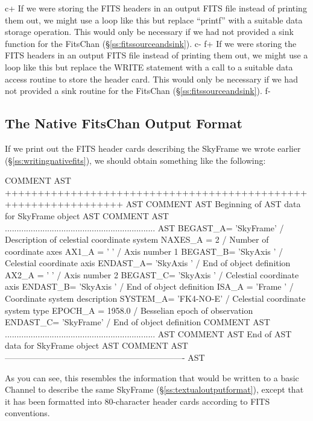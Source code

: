 \documentclass[twoside,11pt]{starlink}
\providecommand{\secref}[1]{\S\ref{#1}}
\begin{document}
{c+
If we were storing the FITS headers in an output FITS file instead of
printing them out, we might use a loop like this but replace
``printf'' with a suitable data storage operation. This would only be
necessary if we had not provided a sink function for the FitsChan
(\secref{ss:fitssourceandsink}).
c-
f+
If we were storing the FITS headers in an output FITS file instead of
printing them out, we might use a loop like this but replace the WRITE
statement with a call to a suitable data access routine to store the
header card. This would only be necessary if we had not provided a
sink routine for the FitsChan (\secref{ss:fitssourceandsink}).
f-

\subsection{The Native FitsChan Output Format}

If we print out the FITS header cards describing the SkyFrame we wrote
earlier (\secref{ss:writingnativefits}), we should obtain something
like the following:

\small
\begin{terminalv}
COMMENT AST ++++++++++++++++++++++++++++++++++++++++++++++++++++++++++++++++ AST
COMMENT AST            Beginning of AST data for SkyFrame object             AST
COMMENT AST ................................................................ AST
BEGAST_A= 'SkyFrame'           / Description of celestial coordinate system
NAXES_A =                    2 / Number of coordinate axes
AX1_A   = '        '           / Axis number 1
BEGAST_B= 'SkyAxis '           / Celestial coordinate axis
ENDAST_A= 'SkyAxis '           / End of object definition
AX2_A   = '        '           / Axis number 2
BEGAST_C= 'SkyAxis '           / Celestial coordinate axis
ENDAST_B= 'SkyAxis '           / End of object definition
ISA_A   = 'Frame   '           / Coordinate system description
SYSTEM_A= 'FK4-NO-E'           / Celestial coordinate system type
EPOCH_A =               1958.0 / Besselian epoch of observation
ENDAST_C= 'SkyFrame'           / End of object definition
COMMENT AST ................................................................ AST
COMMENT AST               End of AST data for SkyFrame object                AST
COMMENT AST ---------------------------------------------------------------- AST
\end{terminalv}
\normalsize

As you can see, this resembles the information that would be written
to a basic Channel to describe the same SkyFrame
(\secref{ss:textualoutputformat}), except that it has been formatted
into 80-character header cards according to FITS conventions.

}
\end{document}
